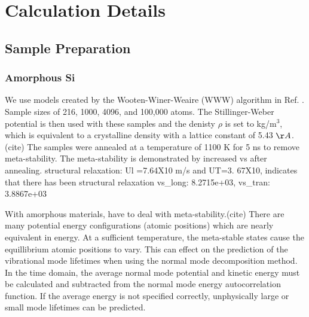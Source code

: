 \documentclass[aps,prb,twocolumn,superscriptaddress,footinbib,amsmath,amssymb,floatfix]{revtex4}
\begin{document}

\section{\label{S:Calculation}Calculation Details}

\subsection{\label{S:Sample}Sample Preparation}

\subsubsection{\label{S:Sample:Si}Amorphous Si}

We use models created by the Wooten-Winer-Weaire (WWW) algorithm in  
Ref. .  Sample sizes of 
216, 1000, 4096, and 100,000 atoms. The Stillinger-Weber potential is 
then used with these samples and the denisty $\rho$ is set to 
kg/m$^3$, which 
is equivalent to a crystalline density with a lattice constant of 
5.43 $\AA$.(cite)  
The samples were annealed at a temperature of 1100 K for 5 ns to remove 
meta-stability. The meta-stability is demonstrated by increased vs after 
annealing. structural relaxation:  Ul =7.64X10 m/s and UT=3. 67X10, 
indicates that 
there has been structural relaxation 
vs_long: 8.2715e+03, vs_tran: 3.8867e+03

With amorphous materials, 
have to deal with meta-stability.(cite) There are many potential energy 
configurations 
(atomic positions) which are nearly equivalent in energy.  At a sufficient 
temperature, the meta-stable states cause the equillibrium atomic positions 
to vary.  This can effect on the prediction of the vibrational mode 
lifetimes when using the normal 
mode decomposition method. In the time domain, the average normal 
mode potential and kinetic energy must be calculated and subtracted 
from the normal mode energy autocorrelation function.  If the average 
energy is not specified correctly, unphysically large or small mode 
lifetimes can be predicted.
\end{document}
